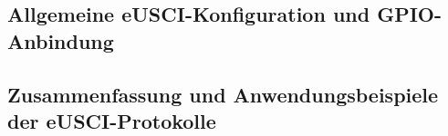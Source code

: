 \newpage
\subsection{Allgemeine eUSCI-Konfiguration und GPIO-Anbindung}
\label{eUSCI_Konfiguration}

\subsection{Zusammenfassung und Anwendungsbeispiele der eUSCI-Protokolle}
\label{eUSCI_Zusammenfassung}